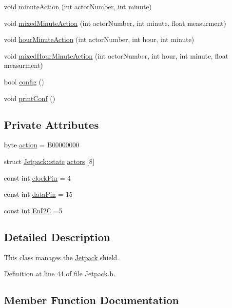\begin{DoxyCompactItemize}
\item 
void \hyperlink{class_jetpack_a97da41141c7b53ddee61143519c8d17d}{minute\+Action} (int actor\+Number, int minute)
\item 
void \hyperlink{class_jetpack_acf8ed1fb594b9e8e224f4ed872a8e093}{mixed\+Minute\+Action} (int actor\+Number, int minute, float measurment)
\item 
void \hyperlink{class_jetpack_ae01c13c785ebdf1b0bb5500234aba1bd}{hour\+Minute\+Action} (int actor\+Number, int hour, int minute)
\item 
void \hyperlink{class_jetpack_a273dae1517b56f0242e28b8944edc26b}{mixed\+Hour\+Minute\+Action} (int actor\+Number, int hour, int minute, float measurment)
\item 
bool \hyperlink{class_jetpack_ab065ee83e244265a2223a22f3ee4a719}{config} ()
\item 
void \hyperlink{class_jetpack_ac54a7bb4f9166bee32052253d9b1d306}{print\+Conf} ()
\end{DoxyCompactItemize}
\subsection*{Private Attributes}
\begin{DoxyCompactItemize}
\item 
byte \hyperlink{class_jetpack_aca3142925a7b0834b34ae91d26af7765}{action} = B00000000
\item 
struct \hyperlink{struct_jetpack_1_1state}{Jetpack\+::state} \hyperlink{class_jetpack_a7e16d2f97837f9712a2e6de1c50d99db}{actors} \mbox{[}8\mbox{]}
\item 
const int \hyperlink{class_jetpack_a58ebb991f358f3ae94e82148b0221b5a}{clock\+Pin} = 4
\item 
const int \hyperlink{class_jetpack_a3d669a56e93c71dd25f970d4ed7d0c00}{data\+Pin} = 15
\item 
const int \hyperlink{class_jetpack_a81df984fb4cea98c71aa1a1cfcdfe814}{En\+I2C} =5
\end{DoxyCompactItemize}


\subsection{Detailed Description}
This class manages the \hyperlink{class_jetpack}{Jetpack} shield. 

Definition at line 44 of file Jetpack.\+h.



\subsection{Member Function Documentation}
\mbox{\label{class_jetpack_a5a53e1ebf7aaf3bf3e0d37ea64ca09a7}} 
